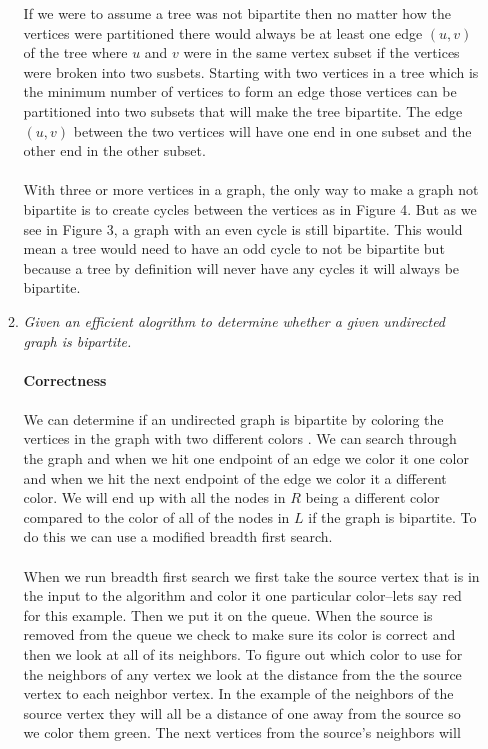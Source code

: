 \documentclass[12pt]{article}
\begin{document}
\begin{enumerate}
\begin{enumerate}
			If we were to assume a tree was not bipartite then no matter how the vertices were partitioned there would always be at least one edge $(u,v)$ of the tree where $u$ and $v$ were in the 
			same vertex subset if the vertices were broken into two susbets.  
			Starting with two vertices in a tree which is the minimum number of vertices to form an edge those vertices can be partitioned into two subsets that will make the tree bipartite.  
			The edge $(u,v)$ between the two vertices will have one end in one subset and the other end in the other subset.\\
			\\
			With three or more vertices in a graph, the only way to make a graph not bipartite is to create cycles between the vertices as in Figure 4.  But as we see in Figure 3, a graph with an even cycle is still bipartite.  
			This would mean a tree would need to have an odd cycle to not be bipartite but because a tree by definition will never have any cycles it will always be bipartite.\\    
			\newpage
			\item \textit{Given an efficient alogrithm to determine whether a given undirected graph is bipartite.}\\
			\\
			\textbf{Correctness}\\
			\\
			We can determine if an undirected graph is bipartite by coloring the vertices in the graph with two different colors \cite{7}.
			We can search through the graph and when we hit one endpoint of an edge we color it one color and when we hit the next endpoint of the edge we color it a different color.
			We will end up with all the nodes in $R$ being a different color compared to the color of all of the nodes in $L$ if the graph is bipartite.
			To do this we can use a modified breadth first search.\\
			\\
			When we run breadth first search we first take the source vertex that is in the input to the algorithm and color it one particular color--lets say red for this example.
			Then we put it on the queue.  When the source is removed from the queue we check to make sure its color is correct and then we look at all of its neighbors.  
			To figure out which color to use for the neighbors of any vertex we look at the distance from the the source vertex to each neighbor vertex.  
			In the example of the neighbors of the source vertex they will all be a distance of one away from the source so we color them green.  The next vertices from the source's neighbors will

\end{enumerate}
\end{enumerate}
\end{document}
